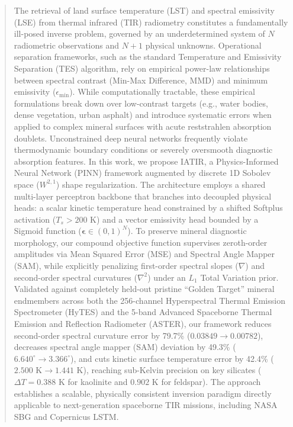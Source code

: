 \documentclass[journal]{IEEEtran}
\begin{document}
\begin{abstract}
The retrieval of land surface temperature (LST) and spectral emissivity (LSE) from thermal infrared (TIR) radiometry constitutes a fundamentally ill-posed inverse problem, governed by an underdetermined system of $N$ radiometric observations and $N+1$ physical unknowns. Operational separation frameworks, such as the standard Temperature and Emissivity Separation (TES) algorithm, rely on empirical power-law relationships between spectral contrast (Min-Max Difference, MMD) and minimum emissivity ($\epsilon_{\min}$). While computationally tractable, these empirical formulations break down over low-contrast targets (e.g., water bodies, dense vegetation, urban asphalt) and introduce systematic errors when applied to complex mineral surfaces with acute reststrahlen absorption doublets. Unconstrained deep neural networks frequently violate thermodynamic boundary conditions or severely oversmooth diagnostic absorption features. In this work, we propose IATIR, a Physics-Informed Neural Network (PINN) framework augmented by discrete 1D Sobolev space ($W^{2,1}$) shape regularization. The architecture employs a shared multi-layer perceptron backbone that branches into decoupled physical heads: a scalar kinetic temperature head constrained by a shifted Softplus activation ($T_s > 200\text{ K}$) and a vector emissivity head bounded by a Sigmoid function ($\bm{\epsilon} \in (0, 1)^N$). To preserve mineral diagnostic morphology, our compound objective function supervises zeroth-order amplitudes via Mean Squared Error (MSE) and Spectral Angle Mapper (SAM), while explicitly penalizing first-order spectral slopes ($\nabla$) and second-order spectral curvatures ($\nabla^2$) under an $L_1$ Total Variation prior. Validated against completely held-out pristine ``Golden Target'' mineral endmembers across both the 256-channel Hyperspectral Thermal Emission Spectrometer (HyTES) and the 5-band Advanced Spaceborne Thermal Emission and Reflection Radiometer (ASTER), our framework reduces second-order spectral curvature error by 79.7\% ($0.03849 \rightarrow 0.00782$), decreases spectral angle mapper (SAM) deviation by 49.3\% ($6.640^\circ \rightarrow 3.366^\circ$), and cuts kinetic surface temperature error by 42.4\% ($2.500\text{ K} \rightarrow 1.441\text{ K}$), reaching sub-Kelvin precision on key silicates ($\Delta T = 0.388\text{ K}$ for kaolinite and $0.902\text{ K}$ for feldspar). The approach establishes a scalable, physically consistent inversion paradigm directly applicable to next-generation spaceborne TIR missions, including NASA SBG and Copernicus LSTM.
\end{abstract}
\end{document}
